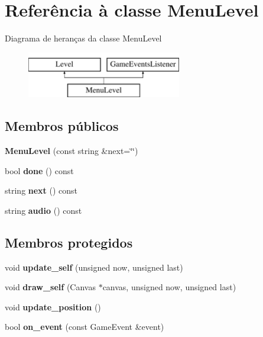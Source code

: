 \hypertarget{classMenuLevel}{}\section{Referência à classe Menu\+Level}
\label{classMenuLevel}
Diagrama de heranças da classe Menu\+Level\begin{figure}[H]
\begin{center}
\leavevmode
\includegraphics[height=2.000000cm]{classMenuLevel}
\end{center}
\end{figure}
\subsection*{Membros públicos}
\begin{DoxyCompactItemize}
\item 
\mbox{\label{classMenuLevel_a207c59fd8fdbb6252bdbbe0d8f73fcf6}} 
{\bfseries Menu\+Level} (const string \&next=\char`\"{}\char`\"{})
\item 
\mbox{\label{classMenuLevel_a2d5ce9ee9de62719ca8225509f0e53b3}} 
bool {\bfseries done} () const
\item 
\mbox{\label{classMenuLevel_ae646a2eb4d55628aef9bd9a2e0ca66d6}} 
string {\bfseries next} () const
\item 
\mbox{\label{classMenuLevel_a3293e74cafcf37c8d2b7cf79ded54d37}} 
string {\bfseries audio} () const
\end{DoxyCompactItemize}
\subsection*{Membros protegidos}
\begin{DoxyCompactItemize}
\item 
\mbox{\label{classMenuLevel_ab84aecb253d1d83b827be0eaf08a3e22}} 
void {\bfseries update\+\_\+self} (unsigned now, unsigned last)
\item 
\mbox{\label{classMenuLevel_a62ac78a0d9ddbe89ef41b9c13f8db99f}} 
void {\bfseries draw\+\_\+self} (Canvas $\ast$canvas, unsigned now, unsigned last)
\item 
\mbox{\label{classMenuLevel_abdc07d5fc61e4767f81c56b1198e848e}} 
void {\bfseries update\+\_\+position} ()
\item 
\mbox{\label{classMenuLevel_a8d450674d7c3678c7ff1f146b3e63be1}} 
bool {\bfseries on\+\_\+event} (const Game\+Event \&event)
\end{DoxyCompactItemize}


